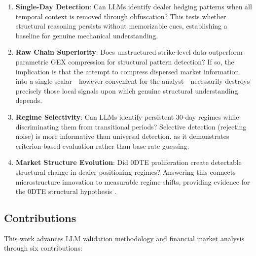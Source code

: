 \begin{enumerate}
\item \textbf{Single-Day Detection}: Can LLMs identify dealer hedging patterns when all temporal context is removed through obfuscation? This tests whether structural reasoning persists without memorizable cues, establishing a baseline for genuine mechanical understanding.

\item \textbf{Raw Chain Superiority}: Does unstructured strike-level data outperform parametric GEX compression for structural pattern detection? If so, the implication is that the attempt to compress dispersed market information into a single scalar---however convenient for the analyst---necessarily destroys precisely those local signals upon which genuine structural understanding depends.

\item \textbf{Regime Selectivity}: Can LLMs identify persistent 30-day regimes while discriminating them from transitional periods? Selective detection (rejecting noise) is more informative than universal detection, as it demonstrates criterion-based evaluation rather than base-rate guessing.

\item \textbf{Market Structure Evolution}: Did 0DTE proliferation create detectable structural change in dealer positioning regimes? Answering this connects microstructure innovation to measurable regime shifts, providing evidence for the 0DTE structural hypothesis \citep{dim2025zero}.
\end{enumerate}

\subsection{Contributions}

This work advances LLM validation methodology and financial market analysis through six contributions:

